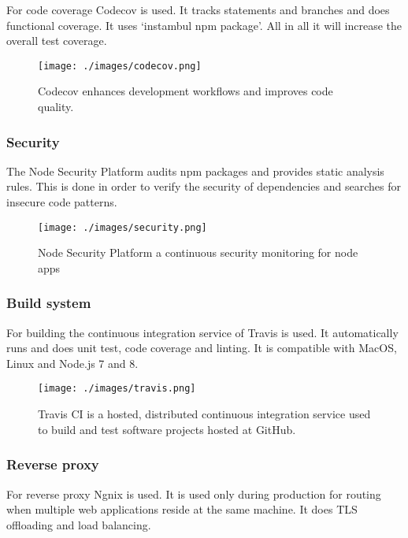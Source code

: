 For code coverage Codecov is used. It tracks statements and branches and does functional coverage. It uses `instambul npm package'. All in all it will increase the overall test coverage.

\begin{figure}[h]
  \begin{center}
    \texttt{[image: ./images/codecov.png]}
    \caption{Codecov enhances development workflows and improves code quality.}
    \label{fig:}
  \end{center}
\end{figure}


\subsubsection{Security}
The Node Security Platform audits npm packages and provides static analysis rules. This is done in order to verify the security of dependencies and searches for insecure code patterns.

\begin{figure}[h]
  \begin{center}
    \texttt{[image: ./images/security.png]}
    \caption{Node Security Platform a continuous security monitoring for node apps}
    \label{fig:}
  \end{center}
\end{figure}

\subsubsection{Build system}
For building the continuous integration service of Travis is used. It automatically runs and does unit test, code coverage and linting. It is compatible with MacOS, Linux and Node.js 7 and 8.

\begin{figure}[h]
  \begin{center}
    \texttt{[image: ./images/travis.png]}
    \caption{Travis CI is a hosted, distributed continuous integration service used to build and test software projects hosted at GitHub.}
    \label{fig:}
  \end{center}
\end{figure}

\subsubsection{Reverse proxy}
For reverse proxy Ngnix is used. It is used only during production for routing when multiple web applications reside at the same machine. It does TLS offloading and load balancing.

